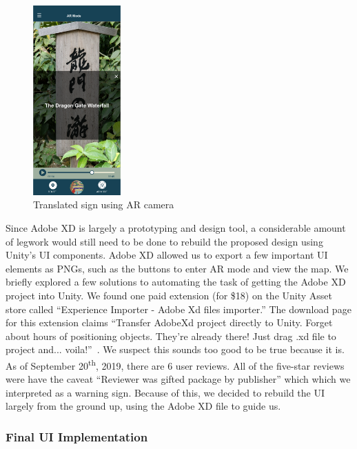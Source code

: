 \documentclass[a4paper, 10pt, american, titlepage]{article}
\begin{document}
\begin{figure}[h] \centering
    \includegraphics[width=0.3\textwidth]{sign-translation.png}
    \caption{Translated sign using AR camera}
    \label{fig:signTranslation}
\end{figure}

Since Adobe XD is largely a prototyping and design tool, a considerable amount
of legwork would still need to be done to rebuild the proposed design using
Unity's UI components. Adobe XD allowed us to export a few important UI
elements as PNGs, such as the buttons to enter AR mode and view the map. We
briefly explored a few solutions to automating the task of getting the Adobe XD
project into Unity. We found one paid extension (for \$18) on the Unity Asset
store called ``Experience Importer - Adobe Xd files importer.'' The download
page for this extension claims ``Transfer AdobeXd project directly to Unity.
Forget about hours of positioning objects. They're already there! Just drag .xd
file to project and...  voila!''~\autocite{glasseye2019}.  We suspect this
sounds too good to be true because it is. As of September
20\textsuperscript{th}, 2019, there are 6 user reviews. All of the five-star
reviews were have the caveat ``Reviewer was gifted package by publisher'' which
which we interpreted as a warning sign. Because of this, we decided to rebuild
the UI largely from the ground up, using the Adobe XD file to guide us.

\subsubsection{Final UI Implementation}
\label{sec:finalUI}
\end{document}
